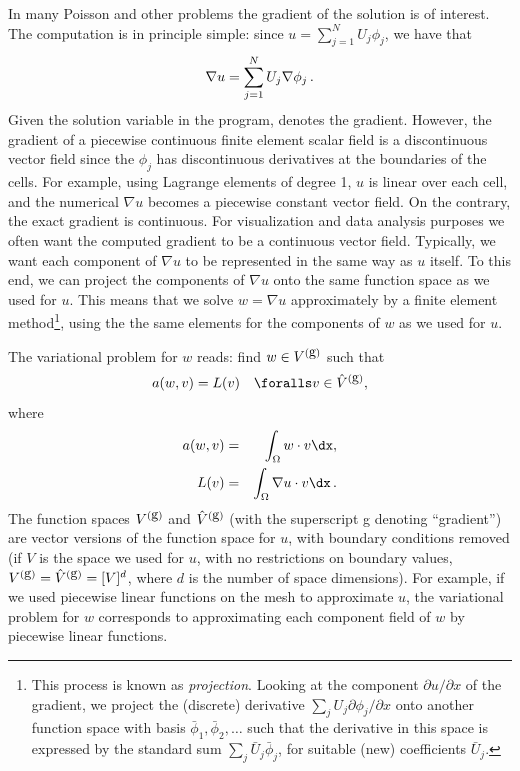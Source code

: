 In many Poisson and other problems the gradient of the solution is
of interest. The computation is in principle simple:
since
$u = \sum_{j=1}^N U_j \phi_j$, we have that
\[ \nabla u = \sum_{j=1}^N U_j \nabla \phi_j\thinspace .\]
Given the solution variable  in the
program,  denotes the
gradient. However, the gradient of a piecewise continuous finite
element scalar field is a discontinuous vector field since the
$\phi_j$ has discontinuous derivatives at the boundaries of the
cells. For example, using Lagrange elements of degree 1, $u$ is linear
over each cell, and the numerical $\nabla u$ becomes a piecewise
constant vector field. On the contrary, the exact gradient is
continuous.  For visualization and data analysis purposes we often
want the computed gradient to be a continuous vector field. Typically,
we want each component of $\nabla u$ to be represented in the same way
as $u$ itself. To this end, we can project the components of $\nabla
u$ onto the same function space as we used for $u$.  This means that
we solve $w = \nabla u$ approximately by a finite element
method\footnote{This process is known as
  \emph{projection}.  Looking at the component
  $\partial u/\partial x$ of the gradient, we project the (discrete)
  derivative $\sum_jU_j{\partial \phi_j/\partial x}$ onto another
  function space with basis $\bar\phi_1,\bar\phi_2,\ldots$ such that
  the derivative in this space is expressed by the standard sum
  $\sum_j\bar U_j\bar \phi_j$, for suitable (new) coefficients $\bar
  U_j$.}, using the the same elements for the components of $w$ as we
used for $u$.

The variational problem for $w$ reads: find  $w\in V^{(\mbox{g})}$ such that
\begin{equation}
a(w, v) = L(v)\quad\foralls v\in \Vghat,
\end{equation}
where
\begin{eqnarray}
a(w, v) &=& \int_\Omega w\cdot v\dx,\\
L(v) &=& \int_\Omega \nabla u\cdot v\dx\langtangenep
\end{eqnarray}
The function spaces $V^{(\mbox{g})}$ and $\hat{V}^{(\mbox{g})}$ (with the superscript g
denoting ``gradient'') are vector versions of the function space for
$u$, with boundary conditions removed (if $V$ is the space we used for
$u$, with no restrictions on boundary values, $ V^{(\mbox{g})} = \hat{V}^{(\mbox{g})} =
[V]^d$, where $d$ is the number of space dimensions).  For example, if
we used piecewise linear functions on the mesh to approximate $u$, the
variational problem for $w$ corresponds to approximating each
component field of $w$ by piecewise linear functions.

